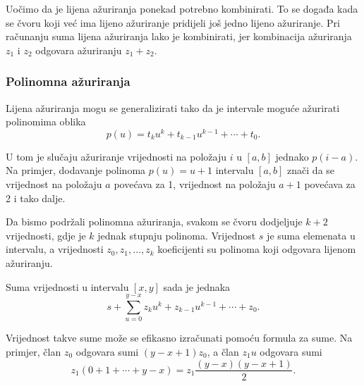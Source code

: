 \begin{center}
\end{center}

Uočimo da je lijena ažuriranja ponekad potrebno kombinirati.
To se događa kada se čvoru koji već ima lijeno ažuriranje
pridijeli još jedno lijeno ažuriranje.
Pri računanju suma lijena ažuriranja lako je kombinirati,
jer kombinacija ažuriranja $z_1$ i $z_2$
odgovara ažuriranju $z_1+z_2$.

\subsubsection{Polinomna ažuriranja}

Lijena ažuriranja mogu se generalizirati tako da je
intervale moguće ažurirati polinomima oblika
\[p(u) = t_k u^k + t_{k-1} u^{k-1} + \cdots + t_0.\]

U tom je slučaju ažuriranje vrijednosti
na položaju $i$ u $[a,b]$ jednako $p(i-a)$.
Na primjer, dodavanje polinoma $p(u)=u+1$
intervalu $[a,b]$ znači da se vrijednost na položaju $a$
povećava za 1, vrijednost na položaju $a+1$
povećava za 2 i tako dalje.

Da bismo podržali polinomna ažuriranja,
svakom se čvoru dodjeljuje $k+2$ vrijednosti,
gdje je $k$ jednak stupnju polinoma.
Vrijednost $s$ je suma elemenata u intervalu,
a vrijednosti $z_0,z_1,\ldots,z_k$ koeficijenti su
polinoma koji odgovara lijenom ažuriranju.

Suma vrijednosti u intervalu $[x,y]$ sada je jednaka
\[s+\sum_{u=0}^{y-x} z_k u^k + z_{k-1} u^{k-1} + \cdots + z_0.\]

Vrijednost takve sume
može se efikasno izračunati pomoću formula za sume.
Na primjer, član $z_0$ odgovara sumi
$(y-x+1)z_0$, a član $z_1 u$ odgovara sumi
\[z_1(0+1+\cdots+y-x) = z_1 \frac{(y-x)(y-x+1)}{2} .\]


